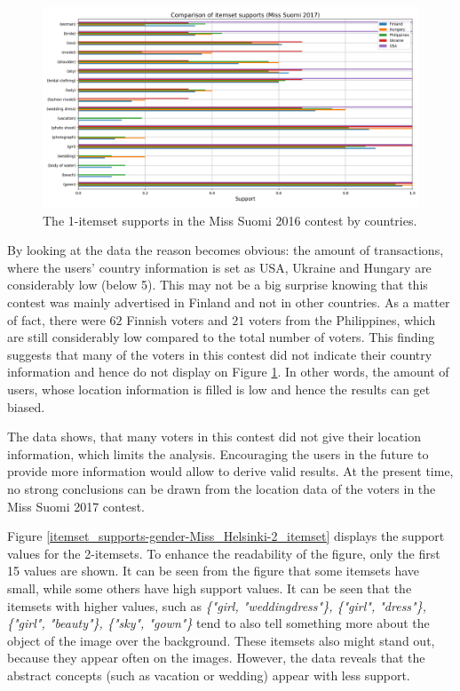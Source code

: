 \begin{figure}[h] 
    \begin{center}
        \includegraphics[width=1.0\textwidth]{Images/itemset_supports-country-Miss_Helsinki-1_itemset.png}
        \caption{The 1-itemset supports in the Miss Suomi 2016 contest by countries.}
        \label{itemset_supports-country-Miss_Helsinki-1_itemset}
    \end{center}
\end{figure}

By looking at the data the reason becomes obvious: the amount of transactions, where the users' country information is set as USA, Ukraine and Hungary are considerably low (below 5). This may not be a big surprise knowing that this contest was mainly advertised in Finland and not in other countries. As a matter of fact, there were $62$ Finnish voters and $21$ voters from the Philippines, which are still considerably low compared to the total number of voters. This finding suggests that many of the voters in this contest did not indicate their country information and hence do not display on Figure \ref{itemset_supports-country-Miss_Helsinki-1_itemset}. In other words, the amount of users, whose location information is filled is low and hence the results can get biased. 

The data shows, that many voters in this contest did not give their location information, which limits the analysis. Encouraging the users in the future to provide more information would allow to derive valid results. At the present time, no strong conclusions can be drawn from the location data of the voters in the Miss Suomi 2017 contest. 

Figure \ref{itemset_supports-gender-Miss_Helsinki-2_itemset} displays the support values for the 2-itemsets. To enhance the readability of the figure, only the first 15 values are shown. It can be seen from the figure that some itemsets have small, while some others have high support values. It can be seen that the itemsets with higher values, such as \textit{\{"girl, "wedding\:dress"\}, \{"girl", "dress"\}, \{"girl", "beauty"\}, \{"sky", "gown"\}} tend to also tell something more about the object of the image over the background. These itemsets also might stand out, because they appear often on the images. However, the data reveals that the abstract concepts (such as vacation or wedding) appear with less support. 

